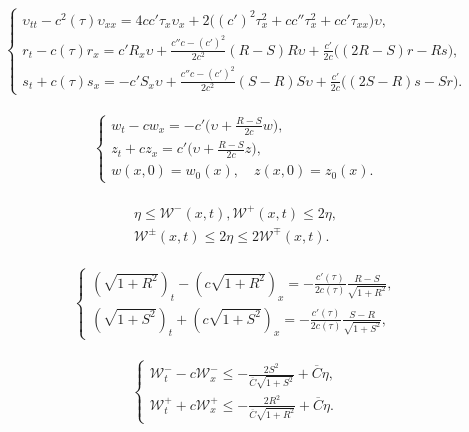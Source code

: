 \documentclass[10pt,a4paper]{amsart}
\newcommand{\dps}{\displaystyle}
\newcommand{\fr}{\frac}
\begin{document}
\begin{align}\label{6.5}
\left\{
\begin{array}{l}
\dps \upsilon_{tt}-c^2(\tau)\upsilon_{xx}=4c c'\tau_x\upsilon_x +2\Big((c')^2\tau_{x}^2 +cc''\tau_{x}^2 +cc'\tau_{xx}\Big)\upsilon, \\[8pt]
\dps r_t-c(\tau)r_x=c'R_x\upsilon +\fr{c''c-(c')^2}{2c^2}(R-S)R\upsilon +\fr{c'}{2c}\Big((2R-S)r -Rs\Big), \\[8pt]
\dps s_t+c(\tau)s_x=-c'S_x\upsilon +\fr{c''c-(c')^2}{2c^2}(S-R)S\upsilon +\fr{c'}{2c}\Big((2S-R)s -Sr\Big).
\end{array}
\right.
\end{align}

\begin{align}\label{6.8}
\left\{
\begin{array}{l}
\dps w_t-cw_x=-c'\Big(\upsilon+\fr{R-S}{2c}w\Big), \\[12pt]
\dps z_t+cz_x=c'\Big(\upsilon+\fr{R-S}{2c}z\Big), \\[8pt]
w(x,0)=w_0(x),\quad z(x,0)=z_0(x).
\end{array}
\right.
\end{align}

\begin{align}\label{6.10}
\begin{split}
\eta\leq \mathcal{W}^-(x,t), \mathcal{W}^+(x,t)\leq 2\eta, \\
\mathcal{W}^\pm(x,t)\leq 2\eta\leq 2\mathcal{W}^\mp(x,t).\
\end{split}
\end{align}

\begin{align}\label{6.11}
\left\{
\begin{array}{l}
\dps (\sqrt{1+R^2})_t-(c\sqrt{1+R^2})_x=-\fr{c'(\tau)}{2c(\tau)}\fr{R-S}{\sqrt{1+R^2}},\\[12pt]
\dps (\sqrt{1+S^2})_t+(c\sqrt{1+S^2})_x=-\fr{c'(\tau)}{2c(\tau)}\fr{S-R}{\sqrt{1+S^2}},
\end{array}
\right.
\end{align}

\begin{align}\label{6.13}
\left\{
\begin{array}{l}
\dps \mathcal{W}_t^--c\mathcal{W}_{x}^-\leq -\fr{2S^2}{\overline{C}\sqrt{1+S^2}} +\overline{C}\eta, \\[12pt]
\dps \mathcal{W}_t^++c\mathcal{W}_{x}^+\leq -\fr{2R^2}{\overline{C}\sqrt{1+R^2}} +\overline{C}\eta.
\end{array}
\right.
\end{align}
\end{document}
